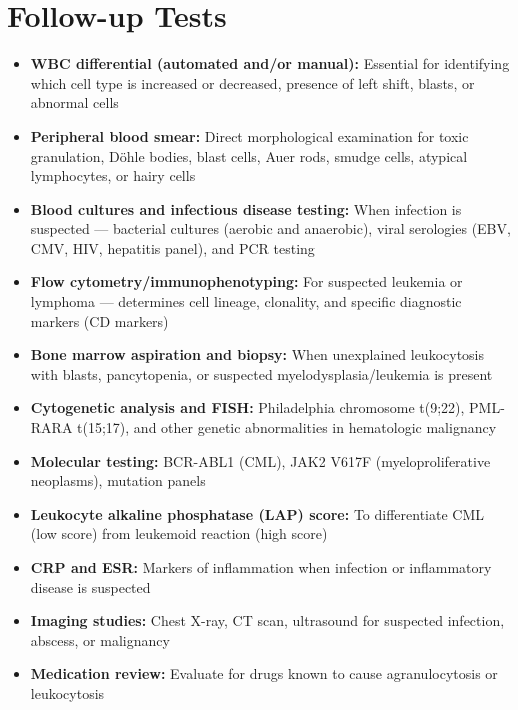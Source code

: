 \section*{Follow-up Tests}
\begin{itemize}
  \item \textbf{WBC differential (automated and/or manual):} Essential for identifying which cell type is increased or decreased, presence of left shift, blasts, or abnormal cells
  \item \textbf{Peripheral blood smear:} Direct morphological examination for toxic granulation, D\"{o}hle bodies, blast cells, Auer rods, smudge cells, atypical lymphocytes, or hairy cells
  \item \textbf{Blood cultures and infectious disease testing:} When infection is suspected --- bacterial cultures (aerobic and anaerobic), viral serologies (EBV, CMV, HIV, hepatitis panel), and PCR testing
  \item \textbf{Flow cytometry/immunophenotyping:} For suspected leukemia or lymphoma --- determines cell lineage, clonality, and specific diagnostic markers (CD markers)
  \item \textbf{Bone marrow aspiration and biopsy:} When unexplained leukocytosis with blasts, pancytopenia, or suspected myelodysplasia/leukemia is present
  \item \textbf{Cytogenetic analysis and FISH:} Philadelphia chromosome t(9;22), PML-RARA t(15;17), and other genetic abnormalities in hematologic malignancy
  \item \textbf{Molecular testing:} BCR-ABL1 (CML), JAK2 V617F (myeloproliferative neoplasms), mutation panels
  \item \textbf{Leukocyte alkaline phosphatase (LAP) score:} To differentiate CML (low score) from leukemoid reaction (high score)
  \item \textbf{CRP and ESR:} Markers of inflammation when infection or inflammatory disease is suspected
  \item \textbf{Imaging studies:} Chest X-ray, CT scan, ultrasound for suspected infection, abscess, or malignancy
  \item \textbf{Medication review:} Evaluate for drugs known to cause agranulocytosis or leukocytosis
\end{itemize}

